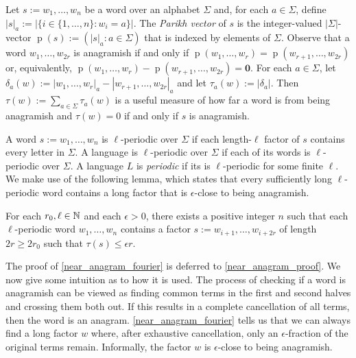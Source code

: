 \documentclass{patmorin}
\DeclareMathOperator{\hist}{p}
\begin{document}
Let $s:=w_1,\ldots,w_n$ be a word over an alphabet $\Sigma$ and, for each $a\in \Sigma$, define $|s|_a:=|\{i\in\{1,\ldots,n\}:w_i=a\}|$.  The \emph{Parikh vector} of $s$ is the integer-valued $|\Sigma|$-vector $\hist(s):=(|s|_{a}:a\in\Sigma)$ that is indexed by elements of $\Sigma$.  Observe that a word $w_1,\ldots,w_{2r}$ is anagramish if and only if $\hist(w_1,\ldots,w_r)=\hist(w_{r+1},\ldots,w_{2r})$ or, equivalently, $\hist(w_1,\ldots,w_r)-\hist(w_{r+1},\ldots,w_{2r})=\boldsymbol{0}$.
For each $a\in\Sigma$, let $\delta_a(w):=|w_1,\ldots,w_r|_{a}-|w_{r+1},\ldots,w_{2r}|_{a}$ and let $\tau_a(w):=|\delta_a|$.
Then $\tau(w):=\sum_{a\in\Sigma}\tau_a(w)$ is a useful measure of how far a word is from being anagramish and $\tau(w)=0$ if and only if $s$ is anagramish.

A word $s:=w_1,\ldots,w_n$ is $\ell$-periodic over $\Sigma$ if each length-$\ell$ factor of $s$ contains every letter in $\Sigma$.  A language is $\ell$-periodic over $\Sigma$ if each of its words is $\ell$-periodic over $\Sigma$.  A language $L$ is \emph{periodic} if its is $\ell$-periodic for some finite $\ell$.  We make use of the following lemma, which states that every sufficiently long $\ell$-periodic word contains a long factor that is $\epsilon$-close to being anagramish.

\begin{lem}\label{near_anagram_fourier}
    For each $r_0,\ell\in\mathbb{N}$ and each $\epsilon>0$, there exists a positive integer $n$ such that each $\ell$-periodic word $w_1,\ldots,w_n$ contains a factor $s:=w_{i+1},\ldots,w_{i+2r}$ of length $2r \ge 2r_0$ such that $\tau(s)\le \epsilon r$.
\end{lem}

The proof of \cref{near_anagram_fourier} is deferred to \cref{near_anagram_proof}.  We now give some intuition as to how it is used.  The process of checking if a word is anagramish can be viewed as finding common terms in the first and second halves and crossing them both out.  If this results in a complete cancellation of all terms, then the word is an anagram.  \cref{near_anagram_fourier} tells us that we can always find a long factor $w$ where, after exhaustive cancellation, only an $\epsilon$-fraction of the original terms remain.  Informally, the factor $w$ is $\epsilon$-close to being anagramish.
\end{document}
